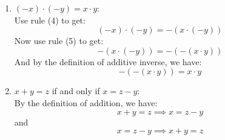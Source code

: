 \documentclass{article}
\begin{document}
\begin{enumerate}
    \item $(-x) \cdot (-y) = x \cdot y$: \\
    Use rule (4) to get:
    \[
      (-x) \cdot (-y) = -(x \cdot (-y))
    \]
    Now use rule (5) to get:
    \[
      -(x \cdot (-y)) = -(-(x \cdot y))
    \]
      And by the definition of additive inverse, we have:
      \[
         -(-(x \cdot y)) = x \cdot y
      \]
    \item $x + y = z$ if and only if $x = z - y$: \\
    By the definition of addition, we have:
    \[
    x + y = z \implies x = z - y
    \]
    and
    \[
    x = z - y \implies x + y = z
    \]
\end{enumerate}
\end{document}
